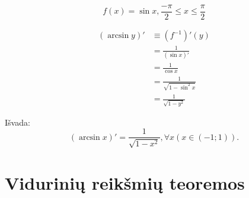 \begin{exmp}
  \begin{equation*}
    f(x) = \sin x, \frac{-\pi}{2} \leq x \leq \frac{\pi}{2}
  \end{equation*}

  \begin{align*}
    (\arcsin y)' 
    &\equiv (f ^{-1})'(y) \\
    &= \frac{1}{(\sin x)'} \\
    &= \frac{1}{\cos x} \\
    &= \frac{1}{\sqrt{1 - \sin^{2} x}} \\
    &= \frac{1}{\sqrt{1 - y^{2}}}
  \end{align*}

  Išvada:
  \begin{equation*}
    (\arcsin x)' = \frac{1}{\sqrt{1 - x^{2}}}, \forall x (x \in (-1; 1)).
  \end{equation*}
\end{exmp}

\section{Vidurinių reikšmių teoremos}

